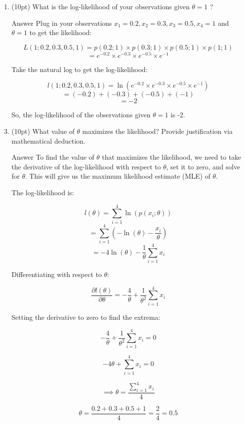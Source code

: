 \documentclass[10pt, a4paper]{article}
\begin{document}
\begin{enumerate}[label = (\alph*)]
    \item (10pt) What is the log-likelihood of your observations given $\theta=1$ ?

    \item[Answer] Plug in your observations \( x_1=0.2, x_2=0.3, x_3=0.5, x_4=1 \) and \( \theta=1 \) to get the likelihood:
    
    \[ L(1; 0.2, 0.3, 0.5, 1) = p(0.2;1) \times p(0.3;1) \times p(0.5;1) \times p(1;1) \]
    \[ = e^{-0.2} \times e^{-0.3} \times e^{-0.5} \times e^{-1} \]
    
    Take the natural log to get the log-likelihood:
    
    \[ l(1; 0.2, 0.3, 0.5, 1) = \ln(e^{-0.2} \times e^{-0.3} \times e^{-0.5} \times e^{-1}) \]
    \[ = (-0.2) + (-0.3) + (-0.5) + (-1) \]
    \[ = -2 \]
    
    So, the log-likelihood of the observations given \( \theta=1 \) is -2.

    \item (10pt) What value of $\theta$ maximizes the likelihood? Provide justification via mathematical deduction.

    \item[Answer] To find the value of \( \theta \) that maximizes the likelihood, we need to take the derivative of the log-likelihood with respect to \( \theta \), set it to zero, and solve for \( \theta \). This will give us the maximum likelihood estimate (MLE) of \( \theta \).

    The log-likelihood is:
    
    \[ l(\theta) = \sum_{i=1}^{4} \ln(p(x_i ; \theta)) \]
    \[ = \sum_{i=1}^{4} \left( -\ln(\theta) - \frac{x_i}{\theta} \right) \]
    \[ = -4\ln(\theta) - \frac{1}{\theta} \sum_{i=1}^{4} x_i \]
    
    Differentiating with respect to \( \theta \):
    
    \[ \frac{\partial l(\theta)}{\partial \theta} = -\frac{4}{\theta} + \frac{1}{\theta^2} \sum_{i=1}^{4} x_i \]
    
    Setting the derivative to zero to find the extrema:
    
    \[ -\frac{4}{\theta} + \frac{1}{\theta^2} \sum_{i=1}^{4} x_i = 0 \]
    
    \[ -4\theta + \sum_{i=1}^{4} x_i = 0 \]
    
    \[ \implies \theta = \frac{\sum_{i=1}^{4} x_i}{4} \]
    
    \[ \theta = \frac{0.2 + 0.3 + 0.5 + 1}{4} = \frac{2}{4} = 0.5 \]
\end{enumerate}
\end{document}
